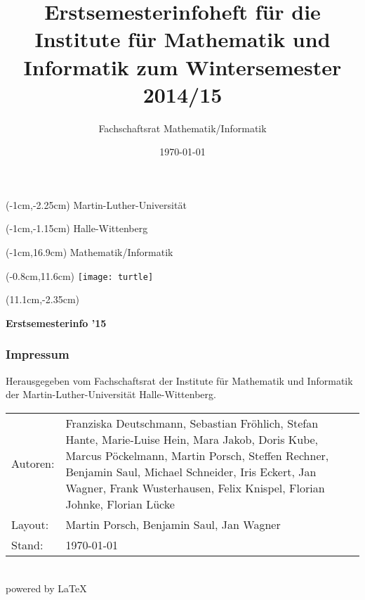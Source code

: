 
\thispagestyle{empty}
\title{Erstsemesterinfoheft für die Institute für Mathematik und Informatik zum
       Wintersemester 2014/15}
\author{Fachschaftsrat Mathematik/Informatik}
\date{\today}

\fontsize{1.05cm}{1cm}
\begin{textblock*}{\paperwidth}(-1cm,-2.25cm)
 \textsf{Martin-Luther-Universität}
\end{textblock*}
\begin{textblock*}{\paperwidth}(-1cm,-1.15cm)
 \textsf{Halle-Wittenberg}
\end{textblock*}
\begin{textblock*}{\paperwidth}(-1cm,16.9cm)
 \textsf{Mathematik/Informatik}
\end{textblock*}
\begin{textblock*}{\paperwidth}(-0.8cm,11.6cm)
 \texttt{[image: turtle]}
\end{textblock*}
\fontsize{2.06cm}{1cm}
\begin{textblock*}{\paperwidth}(11.1cm,-2.35cm)
 \begin{sideways}
  \textsf{\textbf{Erstsemesterinfo ’15}}
 \end{sideways}
\end{textblock*}
\normalsize

\newpage
\thispagestyle{empty}
\subsubsection{Impressum}
Herausgegeben vom Fachschaftsrat der Institute für Mathematik und Informatik der
Martin-Luther-Universität Halle-Wittenberg.\\[1.0em]
\begin{tabularx}{\textwidth}{@{}lX}
 Autoren: & Franziska Deutschmann,                                              %
            Sebastian Fröhlich,
            Stefan Hante,
            Marie-Luise Hein,
            Mara Jakob,
            Doris Kube,
            Marcus Pöckelmann,
            Martin Porsch,
            Steffen Rechner,
            Benjamin Saul,
            Michael Schneider,
            Iris Eckert,
            Jan Wagner,
            Frank Wusterhausen,
            Felix Knispel,
            Florian Johnke,
            Florian Lücke\\
 Layout:  & Martin Porsch, Benjamin Saul, Jan Wagner\\
 Stand:   & \today\\
\end{tabularx}\\[1.0em]
powered by \LaTeX
\pagebreak

